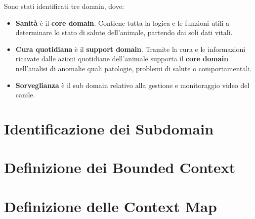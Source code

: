     Sono stati identificati tre domain, dove:
    \begin{itemize}
        \item \textbf{Sanità} è il \textbf{core domain}. Contiene tutta la logica e le funzioni utili a determinare lo stato di salute dell'animale, partendo dai soli dati vitali.
        
        \item \textbf{Cura quotidiana} è il \textbf{support domain}. Tramite la cura e le informazioni ricavate dalle azioni quotidiane dell'animale supporta il \textbf{core domain} nell'analisi di anomalie quali patologie, problemi di salute o comportamentali.
        
        \item \textbf{Sorveglianza} è il sub domain relativo alla gestione e monitoraggio video del canile.
    \end{itemize}
    
    \section{Identificazione dei Subdomain}
    
    \section{Definizione dei Bounded Context}
    
    \section{Definizione delle Context Map}
    